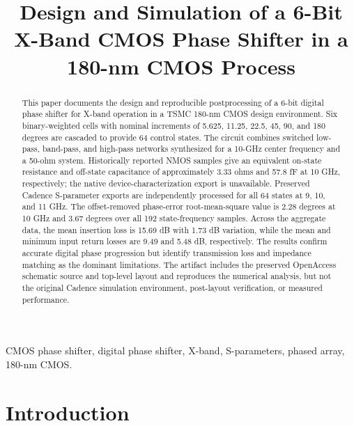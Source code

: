\documentclass[conference]{IEEEtran}
\begin{document}
\title{Design and Simulation of a 6-Bit X-Band CMOS Phase Shifter in a 180-nm CMOS Process}

\author{
}

\maketitle

\begin{abstract}
This paper documents the design and reproducible postprocessing of a 6-bit
digital phase shifter for X-band operation in a TSMC 180-nm CMOS design
environment. Six binary-weighted cells with nominal increments of 5.625,
11.25, 22.5, 45, 90, and 180 degrees are cascaded to provide 64 control
states. The circuit combines switched low-pass, band-pass, and high-pass
networks synthesized for a 10-GHz center frequency and a 50-ohm system.
Historically reported NMOS samples give an equivalent on-state resistance and
off-state capacitance of approximately 3.33 ohms and 57.8 fF at 10 GHz,
respectively; the native device-characterization export is unavailable.
Preserved Cadence S-parameter exports are independently processed for all
64 states at 9, 10, and 11 GHz. The offset-removed phase-error
root-mean-square value is 2.28 degrees at 10 GHz and 3.67 degrees over all
192 state-frequency samples. Across the aggregate data, the mean insertion
loss is 15.69 dB with 1.73 dB variation, while the mean and minimum input
return losses are 9.49 and 5.48 dB, respectively. The results confirm accurate
digital phase progression but identify transmission loss and impedance
matching as the dominant limitations. The artifact includes the preserved
OpenAccess schematic source and top-level layout and reproduces the numerical
analysis, but not the original Cadence simulation environment, post-layout
verification, or measured performance.
\end{abstract}

\begin{IEEEkeywords}
CMOS phase shifter, digital phase shifter, X-band, S-parameters, phased
array, 180-nm CMOS.
\end{IEEEkeywords}

\section{Introduction}
\end{document}
